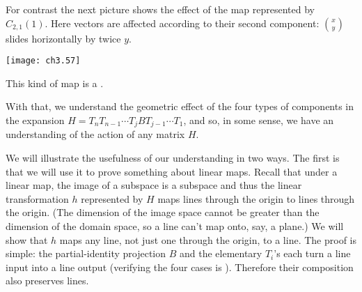 For contrast the next picture shows the effect of the map represented by 
$C_{2,1}(1)$.
Here vectors are affected according to their  
second component:
$\binom{x}{y}$ slides horizontally by twice $y$.
\begin{center}
  \texttt{[image: ch3.57]}
\end{center}
This kind of map is a 
.

With that, we understand the geometric effect of the four types 
of components in the expansion
$H=T_nT_{n-1}\cdots T_jBT_{j-1}\cdots T_1$,
and so, in some sense, we have an understanding  
of the action of any matrix $H$.

We will illustrate the usefulness of our understanding in two ways.
The first is that we will use it to prove something about linear maps. 
Recall that under a linear map, the image of a subspace is a subspace
and thus the linear transformation $h$ represented by $H$ maps lines 
through the origin to lines through the origin.
(The dimension of the image space cannot be greater than 
the dimension of the domain space, so a line can't map onto, say, a plane.)
We will show that $h$ maps any line, 
not just one through the origin, 
to a line.
The proof is simple:
the partial-identity projection $B$ and the elementary $T_i$'s
each turn a line input into a line output 
(verifying the four cases is ).
Therefore their composition also preserves lines.

